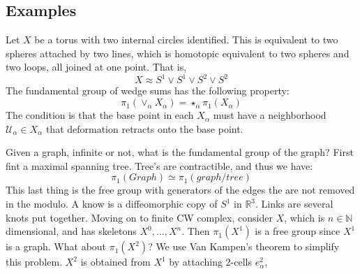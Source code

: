 \documentclass{book}                                                           %
\begin{document}
            \subsection{Examples}
                \begin{example}
                    Let $X$ be a torus with two internal circles
                    identified. This is equivalent to two spheres
                    attached by two lines, which is homotopic equivalent
                    to two spheres and two loops, all joined at one
                    point. That is,
                    \begin{equation}
                        X\approx{S}^{1}\lor{S}^{1}\lor{S}^{2}\lor{S}^{2}
                    \end{equation}
                    The fundamental group of wedge sums has the
                    following property:
                    \begin{equation}
                        \pi_{1}(\lor_{\alpha}X_{\alpha})=
                        \star_{\alpha}\pi_{1}(X_{\alpha})
                    \end{equation}
                    The condition is that the base point in each
                    $X_{\alpha}$ must have a neighborhood
                    $\mathcal{U}_{\alpha}\in{X}_{\alpha}$ that
                    deformation retracts onto the base point.
                \end{example}
                Given a graph, infinite or not, what is the fundamental
                group of the graph? First fint a maximal spanning
                tree. Tree's are contractible, and thus we have:
                \begin{equation}
                    \pi_{1}(Graph)\simeq\pi_{1}(graph/tree)
                \end{equation}
                This last thing is the free group with generators of
                the edges the are not removed in the modulo.
                A know is a diffeomorphic copy of $S^{1}$ in
                $\mathbb{R}^{3}$. Links are several knots put together.
                Moving on to finite CW complex, consider $X$, which
                is $n\in\mathbb{N}$ dimensional, and has skeletons
                $X^{0},\dots,X^{n}$. Then $\pi_{1}(X^{1})$ is a
                free group since $X^{1}$ is a graph. What about
                $\pi_{1}(X^{2})$? We use Van Kampen's theorem to
                simplify this problem. $X^{2}$ is obtained from
                $X^{1}$ by attaching 2-cells $e_{\alpha}^{2}$,
\end{document}
